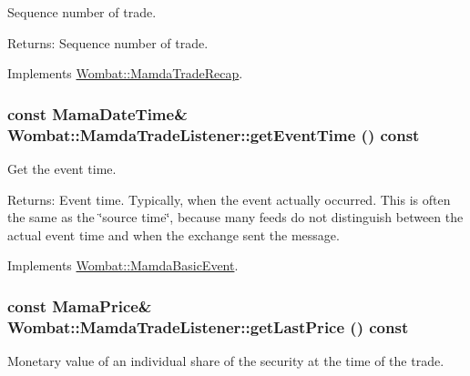 Sequence number of trade. 

\begin{Desc}
\item[Returns:]Sequence number of trade. \end{Desc}


Implements \hyperlink{classWombat_1_1MamdaTradeRecap_51ff9ff94e560b2dfbf16fd4ca64cdb6}{Wombat::Mamda\-Trade\-Recap}.\hypertarget{classWombat_1_1MamdaTradeListener_be370d422774375f2724162d7bfe65c2}{
\subsubsection[getEventTime]{\setlength{\rightskip}{0pt plus 5cm}const Mama\-Date\-Time\& Wombat::Mamda\-Trade\-Listener::get\-Event\-Time () const}}
\label{classWombat_1_1MamdaTradeListener_be370d422774375f2724162d7bfe65c2}


Get the event time. 

\begin{Desc}
\item[Returns:]Event time. Typically, when the event actually occurred. This is often the same as the \char`\"{}source time\char`\"{}, because many feeds do not distinguish between the actual event time and when the exchange sent the message. \end{Desc}


Implements \hyperlink{classWombat_1_1MamdaBasicEvent_7285491c2c657207a64b1b0449c0339b}{Wombat::Mamda\-Basic\-Event}.\hypertarget{classWombat_1_1MamdaTradeListener_71cbfa975acf8586bd072615f32337ff}{
\subsubsection[getLastPrice]{\setlength{\rightskip}{0pt plus 5cm}const Mama\-Price\& Wombat::Mamda\-Trade\-Listener::get\-Last\-Price () const}}
\label{classWombat_1_1MamdaTradeListener_71cbfa975acf8586bd072615f32337ff}


Monetary value of an individual share of the security at the time of the trade. 

